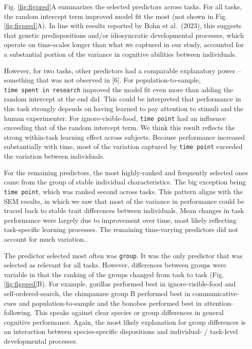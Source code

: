 \documentclass[
  man,floatsintext]{apa6}
\begin{document}
Fig. \ref{fig:figpred}A summarizes the selected predictors across tasks. For all tasks, the random intercept term improved model fit the most (not shown in Fig. \ref{fig:figpred}A). In line with results reported by Bohn et al.~(2023), this suggests that genetic predispositions and/or idiosyncratic developmental processes, which operate on time-scales longer than what we captured in our study, accounted for a substantial portion of the variance in cognitive abilities between individuals.

However, for two tasks, other predictors had a comparable explanatory power -- something that was not observed in {[}6{]}. For population-to-sample, \texttt{time\ spent\ in\ research} improved the model fit even more than adding the random intercept at the end did. This could be interpreted that performance in this task strongly depends on having learned to pay attention to stimuli and the human experimenter. For ignore-visible-food, \texttt{time\ point} had an influence exceeding that of the random intercept term. We think this result reflects the strong within-task learning effect across subjects. Because performance increased substantially with time, most of the variation captured by \texttt{time\ point} exceeded the variation between individuals.

For the remaining predictors, the most highly-ranked and frequently selected ones came from the group of stable individual characteristics. The big exception being \texttt{time\ point}, which was ranked second across tasks. This pattern aligns with the SEM results, in which we saw that most of the variance in performance could be traced back to stable trait differences between individuals. Mean changes in task performance were largely due to improvement over time, most likely reflecting task-specific learning processes. The remaining time-varying predictors did not account for much variation..

The predictor selected most often was \texttt{group}. It was the only predictor that was selected as relevant for all tasks. However, differences between groups were variable in that the ranking of the groups changed from task to task (Fig. \ref{fig:figpred}B). For example, gorillas performed best in ignore-visible-food and self-ordered-search, the chimpanzee group B performed best in communicative-cues and population-to-sample and the bonobos performed best in attention-following. This speaks against clear species or group differences in general cognitive performance. Again, the most likely explanation for group differences is an interaction between species-specific dispositions and individual- / task-level developmental processes.
\end{document}
